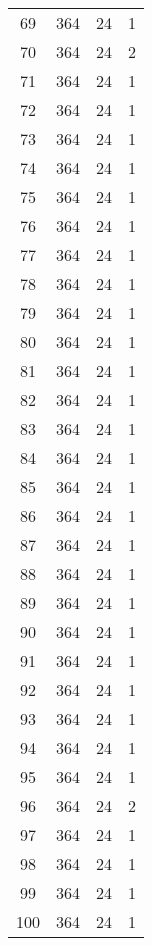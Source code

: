 \begin{longtable}[!]{c|ccc}
	69	& 364	& 24	& 1	\\
	70	& 364	& 24	& 2	\\
	71	& 364	& 24	& 1	\\
	72	& 364	& 24	& 1	\\
	73	& 364	& 24	& 1	\\
	74	& 364	& 24	& 1	\\
	75	& 364	& 24	& 1	\\
	76	& 364	& 24	& 1	\\
	77	& 364	& 24	& 1	\\
	78	& 364	& 24	& 1	\\
	79	& 364	& 24	& 1	\\
	80	& 364	& 24	& 1	\\
	81	& 364	& 24	& 1	\\
	82	& 364	& 24	& 1	\\
	83	& 364	& 24	& 1	\\
	84	& 364	& 24	& 1	\\
	85	& 364	& 24	& 1	\\
	86	& 364	& 24	& 1	\\
	87	& 364	& 24	& 1	\\
	88	& 364	& 24	& 1	\\
	89	& 364	& 24	& 1	\\
	90	& 364	& 24	& 1	\\
	91	& 364	& 24	& 1	\\
	92	& 364	& 24	& 1	\\
	93	& 364	& 24	& 1	\\
	94	& 364	& 24	& 1	\\
	95	& 364	& 24	& 1	\\
	96	& 364	& 24	& 2	\\
	97	& 364	& 24	& 1	\\
	98	& 364	& 24	& 1	\\
	99	& 364	& 24	& 1	\\
	100	& 364	& 24	& 1	\\
\end{longtable}